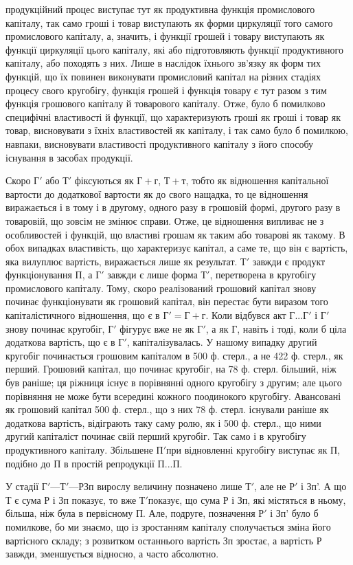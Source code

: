 \parcont{}  %
продукційний процес виступає тут як продуктивна функція промислового
капіталу, так само гроші і товар виступають як форми циркуляції
того самого промислового капіталу, а, значить, і функції грошей і
товару виступають як функції циркуляції цього капіталу, які або
підготовляють функції продуктивного капіталу, або походять з них. Лише
в наслідок їхнього зв’язку як форм тих функцій, що їх повинен виконувати
промисловий капітал на різних стадіях процесу свого кругобігу, функція
грошей і функція товару є тут разом з тим функція грошового капіталу
й товарового капіталу. Отже, було б помилково специфічні властивості
й функції, що характеризують гроші як гроші і товар як товар, висновувати
з їхніх властивостей як капіталу, і так само було б помилкою,
навпаки, висновувати властивості продуктивного капіталу з його способу
існування в засобах продукції.

Скоро $Г'$ або $Т'$ фіксуються як $Г + г$, $Т + т$, тобто як відношення
капітальної вартости до додаткової вартости як до свого нащадка, то це
відношення виражається і в тому і в другому, одного разу в грошовій
формі, другого разу в товаровій, що зовсім не змінює справи. Отже, це
відношення випливає не з особливостей і функцій, що властиві грошам
як таким або товарові як такому. В обох випадках властивість, що характеризує
капітал, а саме те, що він є вартість, яка вилуплює вартість, виражається
лише як результат. $Т'$ завжди є продукт функціонування П, а $Г'$ завжди
є лише форма $Т'$, перетворена в кругобігу промислового капіталу. Тому,
скоро реалізований грошовий капітал знову починає функціонувати як
грошовий капітал, він перестає бути виразом того капіталістичного відношення,
що є в $Г' = Г + г$. Коли відбувся акт $Г... Г'$ і $Г'$ знову починає
кругобіг, $Г'$ фігурує вже не як $Г'$, а як Г, навіть і тоді, коли б ціла
додаткова вартість, що є в $Г'$, капіталізувалась. У нашому випадку другий
кругобіг починається грошовим капіталом в 500 ф. стерл., а не
422 ф. стерл., як перший. Грошовий капітал, що починає кругобіг, на
78 ф. стерл. більший, ніж був раніше; ця ріжниця існує в порівнянні
одного кругобігу з другим; але цього порівняння не може бути всередині
кожного поодинокого кругобігу. Авансовані як грошовий капітал 500 ф.
стерл., що з них 78 ф. стерл. існували раніше як додаткова вартість,
відіграють таку саму ролю, як і 500 ф. стерл., що ними другий капіталіст
починає свій перший кругобіг. Так само і в кругобігу продуктивного
капіталу. Збільшене $П' п$ри відновленні кругобігу виступає як П,
подібно до П в простій репродукції $П... П$.

У стадії $Г' — Т' — Р Зп$ вирослу величину позначено лише $Т'$, але не
$Р'$ і Зп'. А що Т є сума Р і Зп показує, то вже $Т' п$оказує, що сума Р і Зп,
 які містяться в ньому, більша, ніж була в первісному П. Але, подруге,
позначення $Р'$ і Зп' було б помилкове, бо ми знаємо, що із зростанням
капіталу сполучається зміна його вартісного складу; з розвитком останнього
вартість Зп зростає, а вартість Р завжди, зменшується відносно, а часто
абсолютно.

